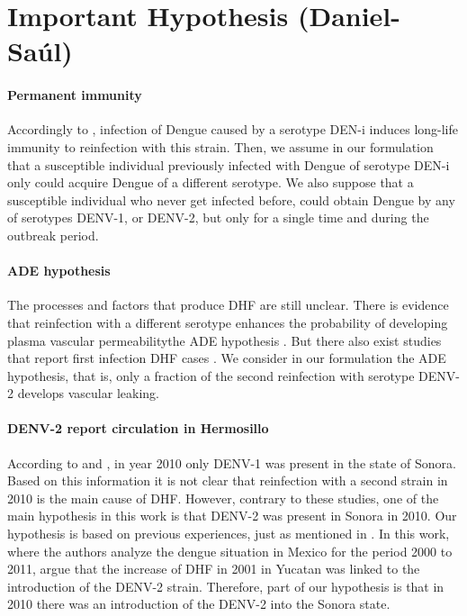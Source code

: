 \section*{Important Hypothesis (Daniel-Saúl)}
    \paragraph{Permanent immunity}
    Accordingly to \cite{WHO}, infection of Dengue caused by a serotype DEN-i
    induces long-life immunity to reinfection with this strain. Then, we
    assume in our formulation that a susceptible individual previously
    infected with Dengue of serotype DEN-i only could acquire Dengue of a 
    different serotype.  We also suppose that a susceptible individual who 
    never get infected before, could obtain Dengue by any of serotypes 
    DENV-1, or DENV-2, but only for a single time and during the outbreak 
    period.
%
    \paragraph{ADE hypothesis}
    The processes and factors that produce \ac{DHF} are still unclear. There is 
    evidence that reinfection with a different serotype enhances the probability 
    of developing plasma vascular permeability\textemdash the \ac{ADE} hypothesis 
    \citep[see, e.g.][p. 295]{Halstead1992}. 
    But there also exist studies that report first infection DHF cases 
    \cite{Debast1993}. We consider in our formulation the ADE hypothesis, that 
    is, only a fraction of the second reinfection with serotype \ac{DENV-2} 
    develops vascular leaking.
%
    \paragraph{\ac{DENV-2} report circulation in Hermosillo}
        
        According to \cite{Vazquez2011} and \cite{Reyes2017}, in year 2010 only DENV-1 
        was present in the state of Sonora. Based on this information 
        it is not clear that reinfection with a second 
        strain in 2010 is the main cause of DHF. 
        However, contrary to these studies, one of the main 
        hypothesis in this work is that DENV-2 was present in Sonora in 2010. 
        Our hypothesis is based on previous experiences, just as mentioned in 
        \cite{Gomez2014}. In this work, where the authors analyze the dengue situation in Mexico for the period 2000 to 2011, argue that the increase of DHF in 2001 in 
        Yucatan was linked to the introduction of the DENV-2 strain. 
        Therefore, part of our hypothesis is that in 2010 there was an 
        introduction of the DENV-2 into the Sonora state. 

